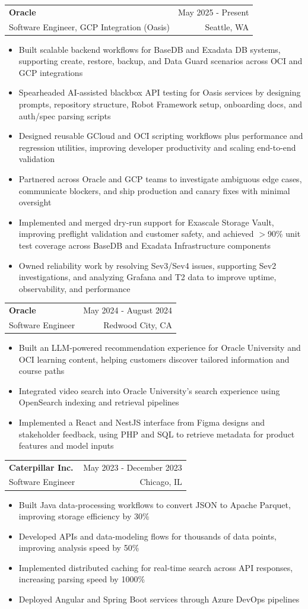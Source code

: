\documentclass[letterpaper,11pt]{article}
\makeatletter
\newcommand{\resumeItem}[1]{
  \item\small{
    {#1 \vspace{-2pt}}
  }
}
\newcommand{\resumeSubheading}[4]{
  \vspace{-2pt}\item
    \begin{tabular*}{0.97\textwidth}[t]{l@{\extracolsep{\fill}}r}
      \textbf{#1} & #2 \\
      {\small#3} & {\small #4} \\
    \end{tabular*}\vspace{-7pt}
}
\newcommand{\resumeItemListStart}{\begin{itemize}}
\newcommand{\resumeItemListEnd}{\end{itemize}\vspace{-5pt}}
\makeatother
\begin{document}
    \resumeSubheading
  {Oracle}{May 2025 - Present}
  {Software Engineer, GCP Integration (Oasis)}{Seattle, WA}
  \resumeItemListStart
    \resumeItem{Built scalable backend workflows for BaseDB and Exadata DB systems, supporting create, restore, backup, and Data Guard scenarios across OCI and GCP integrations}
    \resumeItem{Spearheaded AI-assisted blackbox API testing for Oasis services by designing prompts, repository structure, Robot Framework setup, onboarding docs, and auth/spec parsing scripts}
    \resumeItem{Designed reusable GCloud and OCI scripting workflows plus performance and regression utilities, improving developer productivity and scaling end-to-end validation}
    \resumeItem{Partnered across Oracle and GCP teams to investigate ambiguous edge cases, communicate blockers, and ship production and canary fixes with minimal oversight}
    \resumeItem{Implemented and merged dry-run support for Exascale Storage Vault, improving preflight validation and customer safety, and achieved $>$90\% unit test coverage across BaseDB and Exadata Infrastructure components}
    \resumeItem{Owned reliability work by resolving Sev3/Sev4 issues, supporting Sev2 investigations, and analyzing Grafana and T2 data to improve uptime, observability, and performance}
  \resumeItemListEnd

    \resumeSubheading
      {Oracle}{May 2024 - August 2024}
      {Software Engineer}{Redwood City, CA}
      \resumeItemListStart
        \resumeItem{Built an LLM-powered recommendation experience for Oracle University and OCI learning content, helping customers discover tailored information and course paths}
        \resumeItem{Integrated video search into Oracle University's search experience using OpenSearch indexing and retrieval pipelines}
        \resumeItem{Implemented a React and NestJS interface from Figma designs and stakeholder feedback, using PHP and SQL to retrieve metadata for product features and model inputs}
      \resumeItemListEnd

    \resumeSubheading
      {Caterpillar Inc.}{May 2023 - December 2023}
      {Software Engineer}{Chicago, IL}
      \resumeItemListStart
        \resumeItem{Built Java data-processing workflows to convert JSON to Apache Parquet, improving storage efficiency by 30\%}
        \resumeItem{Developed APIs and data-modeling flows for thousands of data points, improving analysis speed by 50\%}
        \resumeItem{Implemented distributed caching for real-time search across API responses, increasing parsing speed by 1000\%}
        \resumeItem{Deployed Angular and Spring Boot services through Azure DevOps pipelines}
      \resumeItemListEnd
\end{document}
